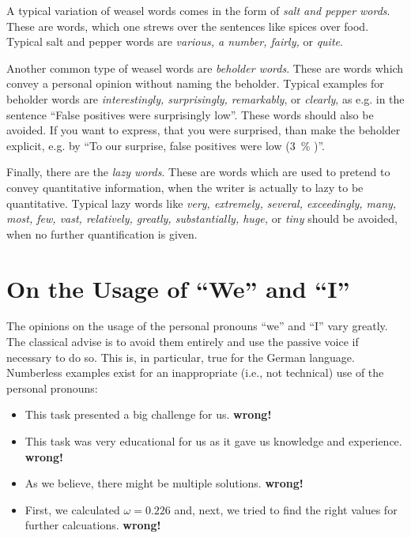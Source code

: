A typical variation of weasel words comes in the form of \emph{salt and pepper words}. 
These are words, which one strews over the sentences like spices over food. 
Typical salt and pepper words are \emph{various, a number, fairly,} or \emph{quite}.

Another common type of weasel words are \emph{beholder words}.
These are words which convey a personal opinion without naming the beholder.
Typical examples for beholder words are \emph{interestingly, surprisingly, remarkably},  or \emph{clearly}, as e.g. in the sentence ``False positives were surprisingly low''.
These words should also be avoided. 
If you want to express, that you were surprised, than make the beholder explicit, e.g. by ``To our surprise, false positives were low (\SI{3}{\percent} )''.

Finally, there are the \emph{lazy words}. 
These are words which are used to pretend to convey quantitative information, when the writer is actually to lazy to be quantitative.
Typical lazy words like \emph{very, extremely, several, exceedingly, many, most, few, vast, relatively, greatly, substantially, huge,} or \emph{tiny} should be avoided, when no further quantification is given.

\section{On the Usage of ``We'' and ``I''} %
The opinions on the usage of the personal pronouns ``we'' and ``I'' vary greatly. 
The classical advise is to avoid them entirely and use the passive voice if necessary to do so.
This is, in particular, true for the German language. 
Numberless examples exist for an inappropriate (i.e., not technical) use of the personal pronouns:
\begin{itemize}
    \item This task presented a big challenge for us. \qquad\textbf{wrong!}
    \item This task was very educational for us as it gave us knowledge and experience. \qquad\textbf{wrong!}
    \item As we believe, there might be multiple solutions. \quad\textbf{wrong!}
    \item First, we calculated $\omega=0.226$ and, next, we tried to find the right values for further calcuations. \qquad\textbf{wrong!}
\end{itemize}

